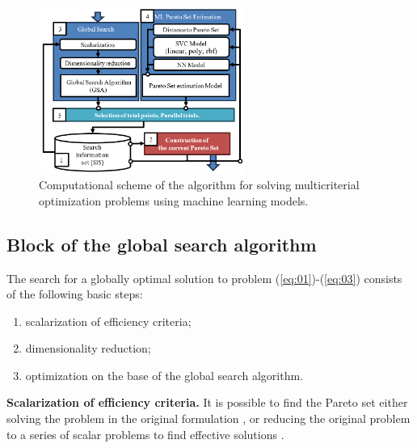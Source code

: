 \documentclass[runningheads]{llncs}
\begin{document}
\begin{figure}[t]
\center
\includegraphics[width=0.6\textwidth]{fig1.png}
\caption{Computational scheme of the algorithm for solving multicriterial optimization problems using machine learning models.} \label{fig1}
\end{figure}


\subsection{Block of the global search algorithm}
\label{subsec31}

The search for a globally optimal solution to problem (\ref{eq:01})-(\ref{eq:03}) consists of the following basic steps:
\begin{enumerate}
	\item scalarization of efficiency criteria;
	\item dimensionality reduction;
	\item optimization on the base of the global search algorithm.
\end{enumerate}

\textbf{Scalarization of efficiency criteria.} It is possible to find the Pareto set either solving the problem in the original formulation \cite{Evtushenko2014,DPA02,Durillo2010,Mostaghim2007,Nebro2009,RC05,Zitzler2001}, or reducing the original problem to a series of scalar problems to find effective solutions \cite{Pardalos2017,Konnov2025,Gergel2019_2,Gergel2018,GergelKozinov2020}. 
\end{document}
